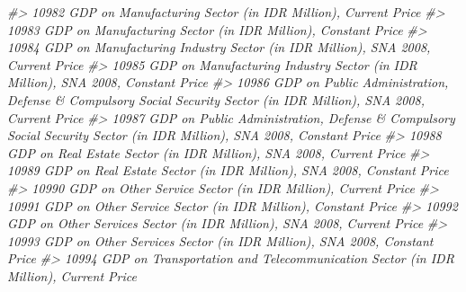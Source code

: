 \documentclass[
]{bxjsbook}
\newenvironment{Shaded}{\begin{snugshade}}{\end{snugshade}}
\newcommand{\CommentTok}[1]{\textcolor[rgb]{0.56,0.35,0.01}{\textit{#1}}}
\theoremstyle{definition}
\theoremstyle{definition}
\theoremstyle{definition}
\theoremstyle{definition}
\theoremstyle{remark}
\begin{document}
\begin{Shaded}
\begin{Highlighting}[]
\CommentTok{\#\textgreater{} 10982                                                                                                               GDP on Manufacturing Sector (in IDR Million), Current Price}
\CommentTok{\#\textgreater{} 10983                                                                                                              GDP on Manufacturing Sector (in IDR Million), Constant Price}
\CommentTok{\#\textgreater{} 10984                                                                                            GDP on Manufacturing Industry Sector (in IDR Million), SNA 2008, Current Price}
\CommentTok{\#\textgreater{} 10985                                                                                           GDP on Manufacturing Industry Sector (in IDR Million), SNA 2008, Constant Price}
\CommentTok{\#\textgreater{} 10986                                                       GDP on Public Administration, Defense \& Compulsory Social Security Sector (in IDR Million), SNA 2008, Current Price}
\CommentTok{\#\textgreater{} 10987                                                      GDP on Public Administration, Defense \& Compulsory Social Security Sector (in IDR Million), SNA 2008, Constant Price}
\CommentTok{\#\textgreater{} 10988                                                                                                       GDP on Real Estate Sector (in IDR Million), SNA 2008, Current Price}
\CommentTok{\#\textgreater{} 10989                                                                                                      GDP on Real Estate Sector (in IDR Million), SNA 2008, Constant Price}
\CommentTok{\#\textgreater{} 10990                                                                                                               GDP on Other Service Sector (in IDR Million), Current Price}
\CommentTok{\#\textgreater{} 10991                                                                                                              GDP on Other Service Sector (in IDR Million), Constant Price}
\CommentTok{\#\textgreater{} 10992                                                                                                    GDP on Other Services Sector (in IDR Million), SNA 2008, Current Price}
\CommentTok{\#\textgreater{} 10993                                                                                                   GDP on Other Services Sector (in IDR Million), SNA 2008, Constant Price}
\CommentTok{\#\textgreater{} 10994                                                                                        GDP on Transportation and Telecommunication Sector (in IDR Million), Current Price}

\end{Highlighting}
\end{Shaded}
\end{document}
